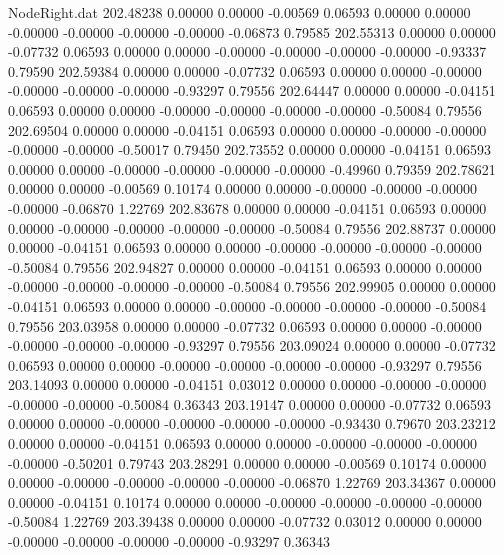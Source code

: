 \begin{filecontents}{NodeRight.dat}
 202.48238    0.00000    0.00000    -0.00569    0.06593    0.00000    0.00000   -0.00000   -0.00000   -0.00000   -0.00000   -0.06873    0.79585
 202.55313    0.00000    0.00000    -0.07732    0.06593    0.00000    0.00000   -0.00000   -0.00000   -0.00000   -0.00000   -0.93337    0.79590
 202.59384    0.00000    0.00000    -0.07732    0.06593    0.00000    0.00000   -0.00000   -0.00000   -0.00000   -0.00000   -0.93297    0.79556
 202.64447    0.00000    0.00000    -0.04151    0.06593    0.00000    0.00000   -0.00000   -0.00000   -0.00000   -0.00000   -0.50084    0.79556
 202.69504    0.00000    0.00000    -0.04151    0.06593    0.00000    0.00000   -0.00000   -0.00000   -0.00000   -0.00000   -0.50017    0.79450
 202.73552    0.00000    0.00000    -0.04151    0.06593    0.00000    0.00000   -0.00000   -0.00000   -0.00000   -0.00000   -0.49960    0.79359
 202.78621    0.00000    0.00000    -0.00569    0.10174    0.00000    0.00000   -0.00000   -0.00000   -0.00000   -0.00000   -0.06870    1.22769
 202.83678    0.00000    0.00000    -0.04151    0.06593    0.00000    0.00000   -0.00000   -0.00000   -0.00000   -0.00000   -0.50084    0.79556
 202.88737    0.00000    0.00000    -0.04151    0.06593    0.00000    0.00000   -0.00000   -0.00000   -0.00000   -0.00000   -0.50084    0.79556
 202.94827    0.00000    0.00000    -0.04151    0.06593    0.00000    0.00000   -0.00000   -0.00000   -0.00000   -0.00000   -0.50084    0.79556
 202.99905    0.00000    0.00000    -0.04151    0.06593    0.00000    0.00000   -0.00000   -0.00000   -0.00000   -0.00000   -0.50084    0.79556
 203.03958    0.00000    0.00000    -0.07732    0.06593    0.00000    0.00000   -0.00000   -0.00000   -0.00000   -0.00000   -0.93297    0.79556
 203.09024    0.00000    0.00000    -0.07732    0.06593    0.00000    0.00000   -0.00000   -0.00000   -0.00000   -0.00000   -0.93297    0.79556
 203.14093    0.00000    0.00000    -0.04151    0.03012    0.00000    0.00000   -0.00000   -0.00000   -0.00000   -0.00000   -0.50084    0.36343
 203.19147    0.00000    0.00000    -0.07732    0.06593    0.00000    0.00000   -0.00000   -0.00000   -0.00000   -0.00000   -0.93430    0.79670
 203.23212    0.00000    0.00000    -0.04151    0.06593    0.00000    0.00000   -0.00000   -0.00000   -0.00000   -0.00000   -0.50201    0.79743
 203.28291    0.00000    0.00000    -0.00569    0.10174    0.00000    0.00000   -0.00000   -0.00000   -0.00000   -0.00000   -0.06870    1.22769
 203.34367    0.00000    0.00000    -0.04151    0.10174    0.00000    0.00000   -0.00000   -0.00000   -0.00000   -0.00000   -0.50084    1.22769
 203.39438    0.00000    0.00000    -0.07732    0.03012    0.00000    0.00000   -0.00000   -0.00000   -0.00000   -0.00000   -0.93297    0.36343

\end{filecontents}
